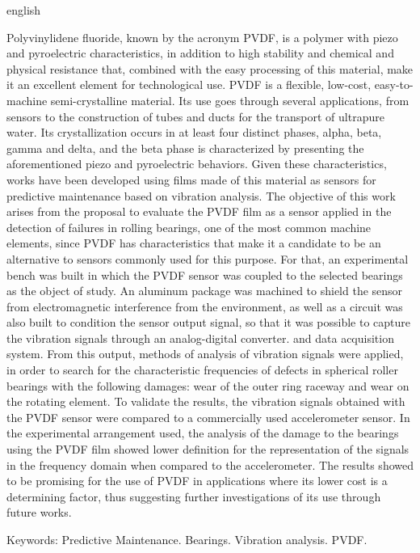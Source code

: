 \documentclass[
	12pt,				
	oneside,			
	a4paper,			
	english,			
	brazil,			
	]{abntex2ppgsi}
\begin{document}

\begin{resumo}[Abstract]
\begin{otherlanguage*}{english}

Polyvinylidene fluoride, known by the acronym PVDF, is a polymer with piezo and pyroelectric characteristics, in addition to high stability and chemical and physical resistance that, combined with the easy processing of this material, make it an excellent element for technological use. PVDF is a flexible, low-cost, easy-to-machine semi-crystalline material. Its use goes through several applications, from sensors to the construction of tubes and ducts for the transport of ultrapure water. Its crystallization occurs in at least four distinct phases, alpha, beta, gamma and delta, and the beta phase is characterized by presenting the aforementioned piezo and pyroelectric behaviors. Given these characteristics, works have been developed using films made of this material as sensors for predictive maintenance based on vibration analysis. The objective of this work arises from the proposal to evaluate the PVDF film as a sensor applied in the detection of failures in rolling bearings, one of the most common machine elements, since PVDF has characteristics that make it a candidate to be an alternative to sensors commonly used for this purpose. For that, an experimental bench was built in which the PVDF sensor was coupled to the selected bearings as the object of study. An aluminum package was machined to shield the sensor from electromagnetic interference from the environment, as well as a circuit was also built to condition the sensor output signal, so that it was possible to capture the vibration signals through an analog-digital converter. and data acquisition system. From this output, methods of analysis of vibration signals were applied, in order to search for the characteristic frequencies of defects in spherical roller bearings with the following damages: wear of the outer ring raceway and wear on the rotating element. To validate the results, the vibration signals obtained with the PVDF sensor were compared to a commercially used accelerometer sensor. In the experimental arrangement used, the analysis of the damage to the bearings using the PVDF film showed lower definition for the representation of the signals in the frequency domain when compared to the accelerometer. The results showed to be promising for the use of PVDF in applications where its lower cost is a determining factor, thus suggesting further investigations of its use through future works.


Keywords: Predictive Maintenance. Bearings. Vibration analysis. PVDF.
\end{otherlanguage*}
\end{resumo}
\end{document}
